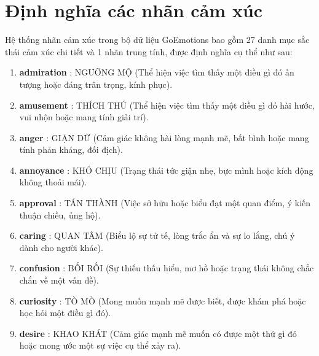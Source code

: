 
\chapter{Định nghĩa các nhãn cảm xúc} %

\label{AppendixA} %


Hệ thống nhãn cảm xúc trong bộ dữ liệu GoEmotions bao gồm 27 danh mục sắc thái cảm xúc chi tiết và 1 nhãn trung tính, được định nghĩa cụ thể như sau:

\begin{enumerate}
	\item \textbf{admiration} : NGƯỠNG MỘ (Thể hiện việc tìm thấy một điều gì đó ấn tượng hoặc đáng trân trọng, kính phục).
	
	\item \textbf{amusement} : THÍCH THÚ (Thể hiện việc tìm thấy một điều gì đó hài hước, vui nhộn hoặc mang tính giải trí).
	
	\item \textbf{anger} : GIẬN DỮ (Cảm giác không hài lòng mạnh mẽ, bất bình hoặc mang tính phản kháng, đối địch).
	
	\item \textbf{annoyance} : KHÓ CHỊU (Trạng thái tức giận nhẹ, bực mình hoặc kích động không thoải mái).
	
	\item \textbf{approval} : TÁN THÀNH (Việc sở hữu hoặc biểu đạt một quan điểm, ý kiến thuận chiều, ủng hộ).
	
	\item \textbf{caring} : QUAN TÂM (Biểu lộ sự tử tế, lòng trắc ẩn và sự lo lắng, chú ý dành cho người khác).
	
	\item \textbf{confusion} : BỐI RỐI (Sự thiếu thấu hiểu, mơ hồ hoặc trạng thái không chắc chắn về một vấn đề).
	
	\item \textbf{curiosity} : TÒ MÒ (Mong muốn mạnh mẽ được biết, được khám phá hoặc học hỏi một điều gì đó).
	
	\item \textbf{desire} : KHAO KHÁT (Cảm giác mạnh mẽ muốn có được một thứ gì đó hoặc mong ước một sự việc cụ thể xảy ra).
	

\end{enumerate}
